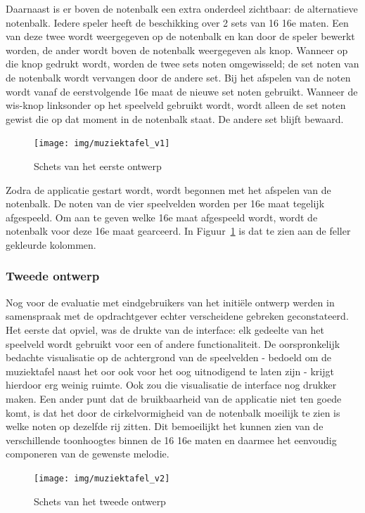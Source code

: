 \documentclass{acm}
\begin{document}
Daarnaast is er boven de notenbalk een extra onderdeel zichtbaar: de alternatieve notenbalk. Iedere speler heeft de beschikking over 2 sets van 16 16e maten. Een van deze twee wordt weergegeven op de notenbalk en kan door de speler bewerkt worden, de ander wordt boven de notenbalk weergegeven als knop. Wanneer op die knop gedrukt wordt, worden de twee sets noten omgewisseld; de set noten van de notenbalk wordt vervangen door de andere set. Bij het afspelen van de noten wordt vanaf de eerstvolgende 16e maat de nieuwe set noten gebruikt. Wanneer de wis-knop linksonder op het speelveld gebruikt wordt, wordt alleen de set noten gewist die op dat moment in de notenbalk staat. De andere set blijft bewaard.

\begin{figure}
  \texttt{[image: img/muziektafel\_v1]}
  \caption{Schets van het eerste ontwerp}
  \label{fig:muziektafel_v1}
\end{figure}

Zodra de applicatie gestart wordt, wordt begonnen met het afspelen van de notenbalk. De noten van de vier speelvelden worden per 16e maat tegelijk afgespeeld. Om aan te geven welke 16e maat afgespeeld wordt, wordt de notenbalk voor deze 16e maat gearceerd. In Figuur~\ref{fig:muziektafel_v1} is dat te zien aan de feller gekleurde kolommen.

\subsubsection{Tweede ontwerp}
Nog voor de evaluatie met eindgebruikers van het initiële ontwerp werden in samenspraak met de opdrachtgever echter verscheidene gebreken geconstateerd. Het eerste dat opviel, was de drukte van de interface: elk gedeelte van het speelveld wordt gebruikt voor een of andere functionaliteit. De oorspronkelijk bedachte visualisatie op de achtergrond van de speelvelden - bedoeld om de muziektafel naast het oor ook voor het oog uitnodigend te laten zijn - krijgt hierdoor erg weinig ruimte. Ook zou die visualisatie de interface nog drukker maken. Een ander punt dat de bruikbaarheid van de applicatie niet ten goede komt, is dat het door de cirkelvormigheid van de notenbalk moeilijk te zien is welke noten op dezelfde rij zitten. Dit bemoeilijkt het kunnen zien van de verschillende toonhoogtes binnen de 16 16e maten en daarmee het eenvoudig componeren van de gewenste melodie.

\begin{figure}
  \texttt{[image: img/muziektafel\_v2]}
  \caption{Schets van het tweede ontwerp}
  \label{fig:muziektafel_v2}
\end{figure}
\end{document}

